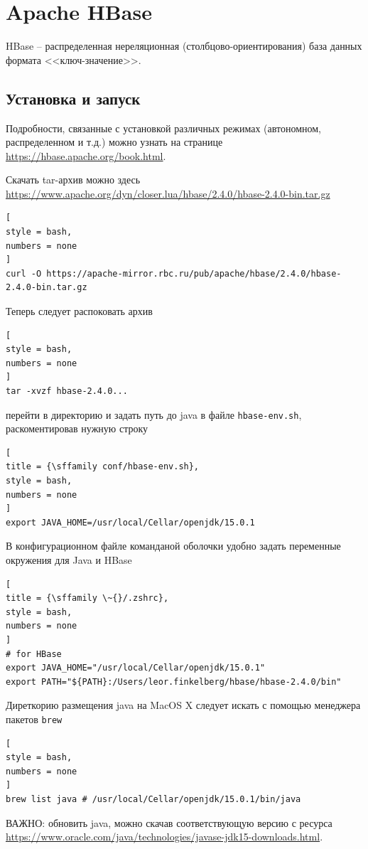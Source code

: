 \documentclass[%
	11pt,
	a4paper,
	utf8,
		]{article}
\begin{document}
\section{Apache HBase}

HBase -- распределенная нереляционная (столбцово-ориентирования) база данных формата <<ключ-значение>>. 

\subsection{Установка и запуск}

Подробности, связанные с установкой различных режимах (автономном, распределенном и т.д.) можно узнать на странице \url{https://hbase.apache.org/book.html}.

Скачать tar-архив можно здесь \url{https://www.apache.org/dyn/closer.lua/hbase/2.4.0/hbase-2.4.0-bin.tar.gz}
\begin{lstlisting}[
style = bash,
numbers = none	
]
curl -O https://apache-mirror.rbc.ru/pub/apache/hbase/2.4.0/hbase-2.4.0-bin.tar.gz
\end{lstlisting}

Теперь следует распоковать архив
\begin{lstlisting}[
style = bash,
numbers = none	
]
tar -xvzf hbase-2.4.0...
\end{lstlisting}
перейти в директорию  и задать путь до java в файле \texttt{hbase-env.sh}, раскоментировав нужную строку
\begin{lstlisting}[
title = {\sffamily conf/hbase-env.sh},
style = bash,
numbers = none	
]
export JAVA_HOME=/usr/local/Cellar/openjdk/15.0.1
\end{lstlisting}

В конфигурационном файле команданой оболочки удобно задать переменные окружения для Java и HBase
\begin{lstlisting}[
title = {\sffamily \~{}/.zshrc},
style = bash,
numbers = none	
]
# for HBase
export JAVA_HOME="/usr/local/Cellar/openjdk/15.0.1"
export PATH="${PATH}:/Users/leor.finkelberg/hbase/hbase-2.4.0/bin"
\end{lstlisting}

Диреткорию размещения java на MacOS X следует искать с помощью менеджера пакетов \texttt{brew}
\begin{lstlisting}[
style = bash,
numbers = none
]
brew list java # /usr/local/Cellar/openjdk/15.0.1/bin/java
\end{lstlisting}

ВАЖНО: обновить java, можно скачав соответствующую версию с ресурса \url{https://www.oracle.com/java/technologies/javase-jdk15-downloads.html}.
\end{document}
